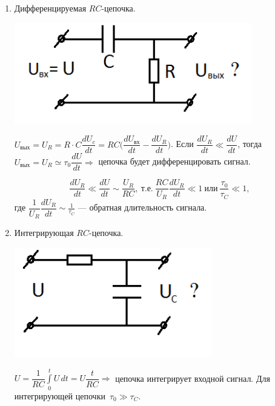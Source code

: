 \documentclass[../main/main.tex]{subfiles}
\begin{document}
\begin{enumerate}
\item Дифференцируемая $RC$-цепочка.

\begin{minipage}{6cm}
\includegraphics[scale=0.5]{../section01/images/R_C_derivate/R_C_derivate.png} %
\end{minipage} \hfill   
\begin{minipage}{9cm}
$U_{\text{вых}} = U_R = R \cdot C\dfrac{dU_c}{dt} = RC\bigg(\dfrac{dU_\text{вх}}{dt} - \dfrac{dU_R}{dt}\bigg)$. Если $\dfrac{dU_R}{dt} \ll \dfrac{dU}{dt}$, тогда $U_\text{вых} = U_R \simeq \tau_0 \dfrac{dU}{dt} \Rightarrow$ цепочка будет дифференцировать сигнал.
\end{minipage}

$$\dfrac{dU_R}{dt} \ll \dfrac{dU}{dt} \sim \dfrac{U_R}{RC},~\text{т.е.}~\dfrac{RC}{U_R} \dfrac{dU_R}{dt} \ll 1~\text{или}~\boxed{\dfrac{\tau_0}{\tau_C} \ll 1},$$
где $\dfrac{1}{U_R} \dfrac{dU_R}{dt} \sim \frac{1}{\tau_C}$ --- обратная длительность сигнала.

\item Интегрирующая $RC$-цепочка.

\begin{minipage}{6cm}
\centering
\includegraphics[scale=0.6]{../section01/images/R_C_integrate/R_C_integrate.png} %
\end{minipage} \hfill   
\begin{minipage}{9cm}
$U = \dfrac{1}{RC} \displaystyle \int\limits_0^t U \, dt = U \dfrac{t}{RC} \Rightarrow$ цепочка интегрирует входной сигнал. Для интегрирующей цепочки~$\tau_0 \gg \tau_C$.
\end{minipage}
\end{enumerate}
\end{document}
